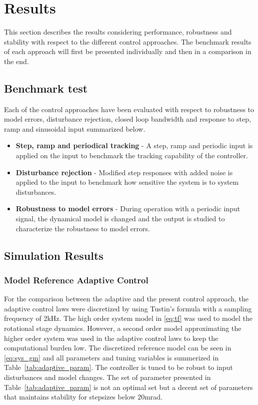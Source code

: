 \chapter{Results}\label{cha:result}
This section describes the results considering performance, robustness and stability with respect to the different control approaches. The benchmark results of each approach will first be presented individually and then in a comparison in the end.

\section{Benchmark test}
Each of the control approaches have been evaluated with respect to robustness to model errors, disturbance rejection, closed loop bandwidth and response to step, ramp and sinusoidal input summarized below.

\begin{itemize}
\item {\bf Step, ramp and periodical tracking} - A step, ramp and periodic input is applied on the input to benchmark the tracking capability of the controller.
\item {\bf Disturbance rejection} - Modified step responses with added noise is applied to the input to benchmark how sensitive the system is to system disturbances.
\item {\bf Robustness to model errors} - During operation with a periodic input signal, the dynamical model is changed and the output is studied to characterize the robustness to model errors.
\end{itemize}

\section{Simulation Results}
\subsection{Model Reference Adaptive Control}

For the comparison between the adaptive and the present control approach, the adaptive control laws were discretized by using Tustin's formula with a sampling frequency of 2kHz. The high order system model in \eqref{eq:tf} was used to model the rotational stage dynamics. However, a second order model approximating the higher order system was used in the adaptive control laws to keep the computational burden low. The discretized reference model can be seen in \eqref{eq:sys_gm} and all parameters and tuning variables is summerized in Table~\ref{tab:adaptive_param}. The controller is tuned to be robust to input disturbances and model changes. The set of parameter presented in Table~\ref{tab:adaptive_param} is not an optimal set but a decent set of parameters that maintains stability for stepsizes below 20mrad.

